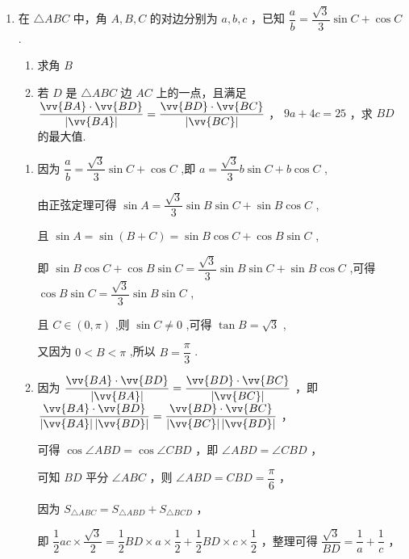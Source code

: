 \begin{enumerate}
    \item 在 $\bigtriangleup  {ABC}$ 中，角 $A,B,C$ 的对边分别为 $a,b,c$ ，已知 $\dfrac{a}{b} = \dfrac{\sqrt{3}}{3}\sin C + \cos C$ .
    \begin{enumerate}
        \item 求角 $B$
        \item 若 $D$ 是 $\bigtriangleup  {ABC}$ 边 ${AC}$ 上的一点，且满足 $\dfrac{\vv{BA} \cdot  \vv{BD}}{\left| \vv{BA}\right| } = \dfrac{\vv{BD} \cdot  \vv{BC}}{\left| \vv{BC}\right| }$ ， ${9a} + {4c} = {25}$ ，求 ${BD}$ 的最大值.
    \end{enumerate}
    \begin{jieda}
        \begin{enumerate}
            \item 因为 $\dfrac{a}{b} = \dfrac{\sqrt{3}}{3}\sin C + \cos C$ ,即 $a = \dfrac{\sqrt{3}}{3}b\sin C + b\cos C$ ,
            
            由正弦定理可得 $\sin A = \dfrac{\sqrt{3}}{3}\sin B\sin C + \sin B\cos C$ ,
            
            且 $\sin A = \sin \left( {B + C}\right)  = \sin B\cos C + \cos B\sin C$ ,
            
            即 $\sin B\cos C + \cos B\sin C = \dfrac{\sqrt{3}}{3}\sin B\sin C + \sin B\cos C$ ,可得 $\cos B\sin C = \dfrac{\sqrt{3}}{3}\sin B\sin C$ ,
            
            且 $C \in  \left( {0,\pi }\right)$ ,则 $\sin C \neq  0$ ,可得 $\tan B = \sqrt{3}$ ,
            
            又因为 $0 < B < \pi$ ,所以 $B = \dfrac{\pi }{3}$ .

            \item 因为 $\dfrac{\vv{BA} \cdot  \vv{BD}}{\left| \vv{BA}\right| } = \dfrac{\vv{BD} \cdot  \vv{BC}}{\left| \vv{BC}\right| }$ ，即 $\dfrac{\vv{BA} \cdot  \vv{BD}}{\left| \vv{BA}\right| \left| \vv{BD}\right| } = \dfrac{\vv{BD} \cdot  \vv{BC}}{\left| \vv{BC}\right| \left| \vv{BD}\right| }$ ，
            
            可得 $\cos \angle {ABD} = \cos \angle {CBD}$ ，即 $\angle {ABD} = \angle {CBD}$ ，
            
            可知 ${BD}$ 平分 $\angle {ABC}$ ，则 $\angle {ABD} = {CBD} = \dfrac{\pi }{6}$ ，
            
            因为 ${S}_{\bigtriangleup {ABC}} = {S}_{\bigtriangleup {ABD}} + {S}_{\bigtriangleup {BCD}}$ ，
            
            即 $\dfrac{1}{2}{ac} \times  \dfrac{\sqrt{3}}{2} = \dfrac{1}{2}{BD} \times  a \times  \dfrac{1}{2} + \dfrac{1}{2}{BD} \times  c \times  \dfrac{1}{2}$ ，整理可得 $\dfrac{\sqrt{3}}{BD} = \dfrac{1}{a} + \dfrac{1}{c}$ ，
            

\end{enumerate}
\end{jieda}
\end{enumerate}
